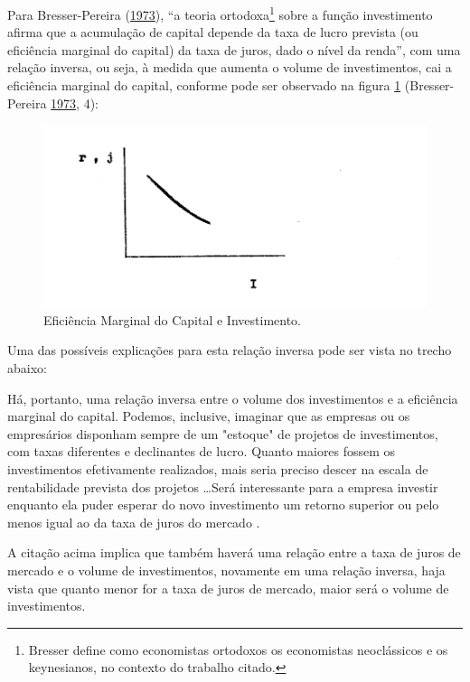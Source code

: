 \documentclass[
	12pt,				%
	oneside,			%
	a4paper,			%
	chapter=TITLE,		%
	section=TITLE,		%
	english,			%
	brazil				%
	]{abntex2}
\begin{document}
Para Bresser-Pereira (\protect\hyperlink{ref-Bresser-Pereira1973}{1973}), ``a teoria ortodoxa\footnote{Bresser define como economistas ortodoxos os economistas neoclássicos e os
  keynesianos, no contexto do trabalho citado.} sobre a função investimento
afirma que a acumulação de capital depende da taxa de lucro prevista (ou
eficiência marginal do capital) da taxa de juros, dado o nível da renda'', com
uma relação inversa, ou seja, à medida que aumenta o volume de investimentos,
cai a eficiência marginal do capital, conforme pode ser observado na
figura \ref{fig:eficienciamarginal} (Bresser-Pereira \protect\hyperlink{ref-Bresser-Pereira1973}{1973}, 4):
\begin{figure}[H]

{\centering \includegraphics[width=0.8\linewidth]{images/Page-4-Image-1} 

}

\caption{Eficiência Marginal do Capital e Investimento.}\label{fig:eficienciamarginal}
\end{figure}
Uma das possíveis explicações para esta relação inversa pode ser vista no trecho
abaixo:
\begin{citacao}
Há, portanto, uma relação inversa entre o volume dos investimentos e a
eficiência marginal do capital. Podemos, inclusive, imaginar que as empresas ou
os empresários disponham sempre de um "estoque" de projetos de investimentos,
com taxas diferentes e declinantes de lucro. Quanto maiores fossem os
investimentos efetivamente realizados, mais seria preciso descer na escala de
rentabilidade prevista dos projetos \ldots Será interessante para a empresa
investir enquanto ela puder esperar do novo investimento um retorno superior ou
pelo menos igual ao da taxa de juros do mercado
\cite[p.~5]{Bresser-Pereira1973}.
\end{citacao}
A citação acima implica que também haverá uma relação entre a taxa de juros de
mercado e o volume de investimentos, novamente em uma relação inversa, haja
vista que quanto menor for a taxa de juros de mercado, maior será o volume de
investimentos.
\end{document}

